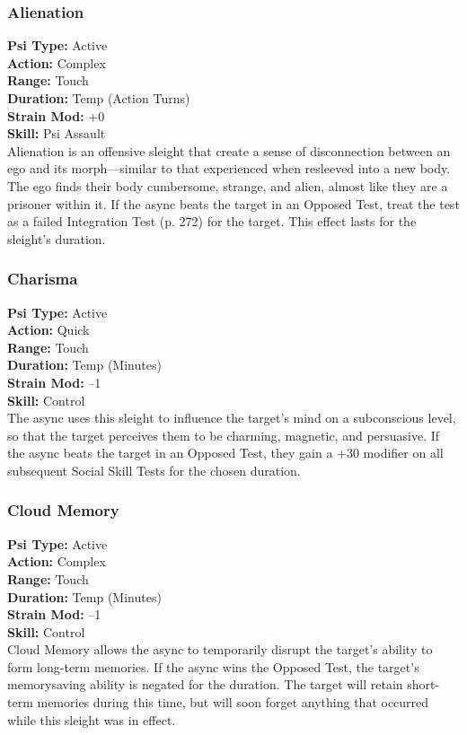 \subsubsection{Alienation}
\textbf{Psi Type:} Active \\ 
\textbf{Action:} Complex \\ 
\textbf{Range:} Touch \\ 
\textbf{Duration:} Temp (Action Turns) \\
\textbf{Strain Mod:} +0 \\ 
\textbf{Skill:} Psi Assault \\
Alienation is an offensive sleight that create a sense of
disconnection between an ego and its morph—similar
to that experienced when resleeved into a new body.
The ego finds their body cumbersome, strange, and
alien, almost like they are a prisoner within it. If the
async beats the target in an Opposed Test, treat the
test as a failed Integration Test (p. 272) for the target.
This effect lasts for the sleight’s duration.

\subsubsection{Charisma}
\textbf{Psi Type:} Active \\ 
\textbf{Action:} Quick \\ 
\textbf{Range:} Touch \\ 
\textbf{Duration:} Temp (Minutes) \\
\textbf{Strain Mod:} –1 \\ 
\textbf{Skill:} Control\\
The async uses this sleight to influence the target’s
mind on a subconscious level, so that the target perceives
them to be charming, magnetic, and persuasive.
If the async beats the target in an Opposed Test, they
gain a +30 modifier on all subsequent Social Skill
Tests for the chosen duration.

\subsubsection{Cloud Memory}
\textbf{Psi Type:} Active \\ 
\textbf{Action:} Complex \\ 
\textbf{Range:} Touch \\ 
\textbf{Duration:} Temp (Minutes) \\
\textbf{Strain Mod:} –1 \\ 
\textbf{Skill:} Control\\
Cloud Memory allows the async to temporarily disrupt
the target’s ability to form long-term memories. If
the async wins the Opposed Test, the target’s memorysaving
ability is negated for the duration. The target
will retain short-term memories during this time, but
will soon forget anything that occurred while this
sleight was in effect.

